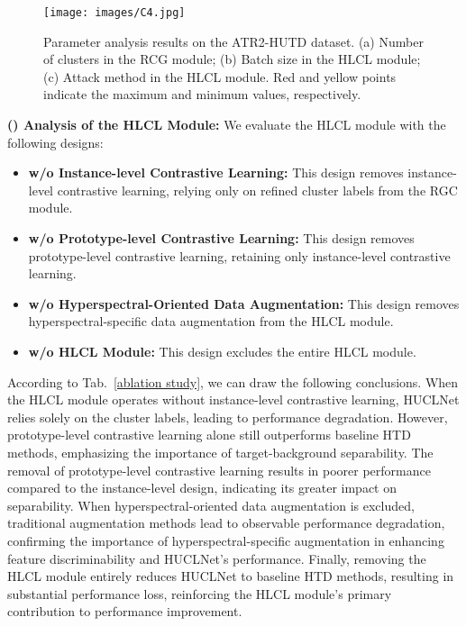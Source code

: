 \par
\begin{figure*}[!t]                 
    \centering                    
    \texttt{[image: images/C4.jpg]}                     
    \caption{Parameter analysis results on the ATR2-HUTD dataset. (a) Number of clusters in the RCG module; (b) Batch size in the HLCL module; (c) Attack method in the HLCL module. Red and yellow points indicate the maximum and minimum values, respectively.}                 
    \label{fig:C4-1}    
\end{figure*}
\textbf{() Analysis of the HLCL Module:} We evaluate the HLCL module with the following designs:
\begin{itemize}
    \item \textbf{w/o Instance-level Contrastive Learning:} This design removes instance-level contrastive learning, relying only on refined cluster labels from the RGC module.
    \item \textbf{w/o Prototype-level Contrastive Learning:} This design removes prototype-level contrastive learning, retaining only instance-level contrastive learning.
    \item \textbf{w/o Hyperspectral-Oriented Data Augmentation:} This design removes hyperspectral-specific data augmentation from the HLCL module.
    \item \textbf{w/o HLCL Module:} This design excludes the entire HLCL module.
\end{itemize}
\par
According to Tab.~\ref{ablation study}, we can draw the following conclusions.
When the HLCL module operates without instance-level contrastive learning, HUCLNet relies solely on the cluster labels, leading to performance degradation. However, prototype-level contrastive learning alone still outperforms baseline HTD methods, emphasizing the importance of target-background separability. The removal of prototype-level contrastive learning results in poorer performance compared to the instance-level design, indicating its greater impact on separability. When hyperspectral-oriented data augmentation is excluded, traditional augmentation methods lead to observable performance degradation, confirming the importance of hyperspectral-specific augmentation in enhancing feature discriminability and HUCLNet's performance. Finally, removing the HLCL module entirely reduces HUCLNet to baseline HTD methods, resulting in substantial performance loss, reinforcing the HLCL module's primary contribution to performance improvement.
